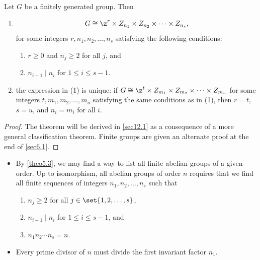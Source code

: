 \begin{theo}
    \label{theo5.3}
    Let $G$ be a finitely generated group. Then
    \begin{enumerate}
        \item 
        \[G \cong \z^r \times Z_{n_1} \times Z_{n_2} \times \cdots \times Z_{n_s},\]
        for some integers $r, n_1, n_2, \ldots, n_s$ satisfying the following conditions:
        \begin{enumerate}
            \item $r \geq 0$ and $n_j \geq 2$ for all $j$, and
            \item $n_{i + 1} \mid n_i$ for $1 \leq i \leq s - 1$.
        \end{enumerate}
        \item the expression in (1) is unique: if $G \cong \z^t \times Z_{m_1} \times Z_{m_2} \times \cdots \times Z_{m_u}$ for some integers $t, m_1, m_2, \ldots, m_u$ satisfying the same conditions as in (1), then $r = t$, $s = u$, and $n_i = m_i$ for all $i$.
    \end{enumerate}
\end{theo}

\begin{proof}
    The theorem will be derived in \autoref{sec12.1} as a consequence of a more general classification theorem. Finite groups are given an alternate proof at the end of \autoref{sec6.1}.
\end{proof}

\begin{ex}
    \begin{itemize}
        \item By \autoref{theo5.3}, we may find a way to list all finite abelian groups of a given order. Up to isomorphism, all abelian groups of order $n$ requires that we find all finite sequences of integers $n_1, n_2, \ldots, n_s$ such that
        \begin{enumerate}
            \item $n_j \geq 2$ for all $j \in \set{1, 2, \ldots, s}$,
            \item $n_{i + 1} \mid n_i$ for $1 \leq i \leq s - 1$, and
            \item $n_1 n_2 \cdots n_s = n$.
        \end{enumerate}
        \item Every prime divisor of $n$ must divide the first invariant factor $n_1$.
    \end{itemize}
\end{ex}

